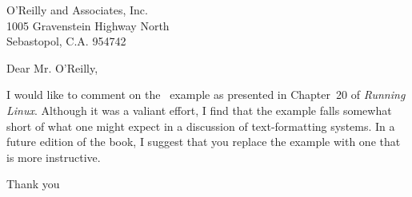 \documentclass{letter}
\begin{document}
\begin{letter}{O'Reilly and Associates, Inc. \\
	1005 Gravenstein Highway North \\
		Sebastopol, C.A. 954742}

\opening{Dear Mr. O'Reilly,}

I would like to comment on the \LeTeX\ example as presented in
Chapter~20 of {\em Running Linux}. Although it was a valiant effort,
I find that the example falls somewhat short of what
one might expect in a discussion of text-formatting systems.
In a future edition of the book, I suggest that you replace
the example with one that is more instructive.

\closing{Thank you}

\end{letter}
\end{document}
